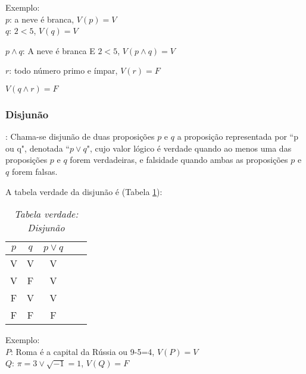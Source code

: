 Exemplo:\\
\textbf{$p$}: a neve é branca, $V(p)=V$\\
\textbf{$q$}: $2<5$, $V(q)=V$
\begin{center}
\textbf{$p\wedge q$}: A neve é branca E $2<5$, $V(p\wedge q)=V$
\end{center}

\textbf{$r$}: todo número primo e ímpar, $V(r)=F$
\begin{center}
$V(q\wedge r)=F$
\end{center}

\subsubsection{Disjunão}
\begin{definicao}[Disjunão]: Chama-se disjunão de duas proposições $p$ e $q$ a proposição representada por ``p ou q", denotada ``$p\vee q$", cujo valor lógico é verdade quando ao menos uma das proposições $p$ e $q$ forem verdadeiras, e falsidade quando ambas as proposições $p$ e $q$ forem falsas.\end{definicao}

A tabela verdade da disjunão é (Tabela \ref{disjuncao}):
\begin{table}[h]
   \centering
   \setlength{\arrayrulewidth}{0,5\arrayrulewidth}
   \caption{\it Tabela verdade: Disjunão}
   \begin{tabular}{|c|c|c|c|c|}
      \hline
      $p$ & $q$ & $p\vee q$ \\
     \hline
      V & V & V \\
      \hline
      V & F & V \\
      \hline
      F & V & V \\
      \hline
      F & F & F \\
      \hline
   \end{tabular}
\label{disjuncao}
\end{table}

Exemplo:\\
\textbf{$P$}: Roma é a capital da Rússia ou 9-5=4, $V(P)=V$\\
\textbf{$Q$}: $\pi=3\vee\sqrt{-1}=1$, $V(Q)=F$

